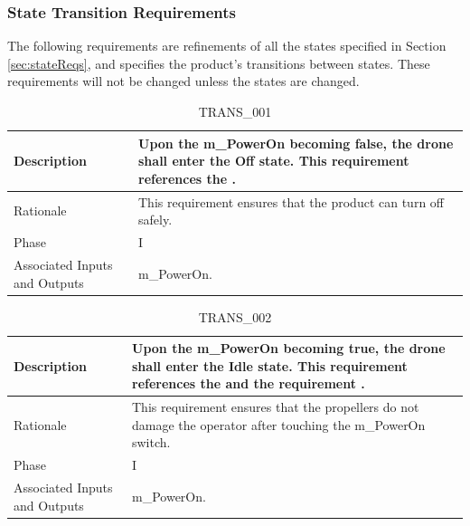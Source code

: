 \documentclass{article}
\begin{document}
\subsubsection{State Transition Requirements}
\label{transReqs}
The following requirements are refinements of all the states specified in Section \ref{sec:stateReqs}, and specifies the product's transitions between states. These requirements will not be changed unless the states are changed.

\begin{table}[!h]
\begin{center}
\caption {TRANS\_001} 
\label{TRANS_001}
\begin{tabular}{ | m{3cm} | m{11cm} | }
\hline
Description & Upon the m\_PowerOn becoming false, the drone shall enter the Off state. This requirement references the \nameref{Off State}. \\
\hline
Rationale & This requirement ensures that the product can turn off safely. \\
\hline
Phase & I \\
\hline
Associated Inputs and Outputs & m\_PowerOn. \\
\hline
\end{tabular}
\end{center}
\end{table}

\begin{table}[!h]
\begin{center}
\caption {TRANS\_002} 
\label{TRANS_002}
\begin{tabular}{ | m{3cm} | m{11cm} | }
\hline
Description & Upon the m\_PowerOn becoming true, the drone shall enter the Idle state. This requirement references the \nameref{Idle State} and the requirement \nameref{SAFE_005}. \\
\hline
Rationale & This requirement ensures that the propellers do not damage the operator after touching the m\_PowerOn switch.  \\
\hline
Phase & I \\
\hline
Associated Inputs and Outputs & m\_PowerOn. \\
\hline
\end{tabular}
\end{center}
\end{table}
\end{document}
